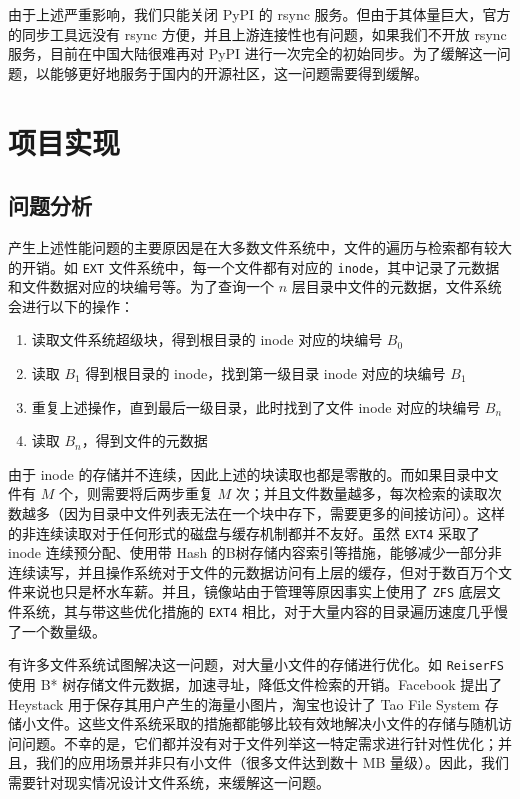 \documentclass{ctexart}
\begin{document}
由于上述严重影响，我们只能关闭 PyPI 的 rsync 服务。但由于其体量巨大，官方的同步工具远没有 rsync 方便，并且上游连接性也有问题，如果我们不开放 rsync 服务，目前在中国大陆很难再对 PyPI 进行一次完全的初始同步。为了缓解这一问题，以能够更好地服务于国内的开源社区，这一问题需要得到缓解。

\section{项目实现}

\subsection{问题分析}

产生上述性能问题的主要原因是在大多数文件系统中，文件的遍历与检索都有较大的开销。如 \texttt{EXT} 文件系统中，每一个文件都有对应的 \texttt{inode}，其中记录了元数据和文件数据对应的块编号等。为了查询一个 $n$ 层目录中文件的元数据，文件系统会进行以下的操作：

\begin{enumerate}
    \item 读取文件系统超级块，得到根目录的 inode 对应的块编号 $B_0$
    \item 读取 $B_1$ 得到根目录的 inode，找到第一级目录 inode 对应的块编号 $B_1$
    \item 重复上述操作，直到最后一级目录，此时找到了文件 inode 对应的块编号 $B_n$
    \item 读取 $B_n$，得到文件的元数据
\end{enumerate}

由于 inode 的存储并不连续，因此上述的块读取也都是零散的。而如果目录中文件有 $M$ 个，则需要将后两步重复 $M$ 次；并且文件数量越多，每次检索的读取次数越多（因为目录中文件列表无法在一个块中存下，需要更多的间接访问）。这样的非连续读取对于任何形式的磁盘与缓存机制都并不友好。虽然 \texttt{EXT4} 采取了 inode 连续预分配、使用带 Hash 的B树存储内容索引等措施，能够减少一部分非连续读写，并且操作系统对于文件的元数据访问有上层的缓存，但对于数百万个文件来说也只是杯水车薪。并且，镜像站由于管理等原因事实上使用了 \texttt{ZFS} 底层文件系统，其与带这些优化措施的 \texttt{EXT4} 相比，对于大量内容的目录遍历速度几乎慢了一个数量级。

有许多文件系统试图解决这一问题，对大量小文件的存储进行优化。如 \texttt{ReiserFS} 使用 B* 树存储文件元数据，加速寻址，降低文件检索的开销。Facebook 提出了 Heystack 用于保存其用户产生的海量小图片，淘宝也设计了 Tao File System 存储小文件。这些文件系统采取的措施都能够比较有效地解决小文件的存储与随机访问问题。不幸的是，它们都并没有对于文件列举这一特定需求进行针对性优化；并且，我们的应用场景并非只有小文件（很多文件达到数十 MB 量级）。因此，我们需要针对现实情况设计文件系统，来缓解这一问题。
\end{document}
